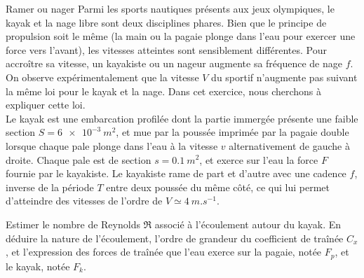 \begin{exo}[PC][3][TD]{Ramer ou nager}
  Parmi les sports nautiques présents aux jeux olympiques, le kayak et la nage libre sont deux disciplines phares. Bien que le principe de propulsion soit le même (la main ou la pagaie plonge dans l'eau pour exercer une force vers l'avant), les vitesses atteintes sont sensiblement différentes. Pour accroître sa vitesse, un kayakiste ou un nageur augmente sa fréquence de nage $f$. On observe expérimentalement que la vitesse $V$ du sportif n'augmente pas suivant la même loi pour le kayak et la nage. Dans cet exercice, nous cherchons à expliquer cette loi.\\ 

  Le kayak est une embarcation profilée dont la partie immergée présente une faible section $S=\SI{6e-3}{m^2}$, et mue par la poussée imprimée par la pagaie double lorsque chaque pale plonge dans l'eau à la vitesse $v$ alternativement de gauche à droite. Chaque pale est de section $s=\SI{0.1}{m^2}$, et exerce sur l'eau la force $F$ fournie par le kayakiste. Le kayakiste rame de part et d'autre avec une cadence $f$, inverse de la période $T$ entre deux poussée du même côté, ce qui lui permet d'atteindre des vitesses de l'ordre de $V\simeq \SI{4}{m.s^{-1}}$.
  \begin{quest}
    \item	Estimer le nombre de Reynolds $\Re$ associé à l'écoulement autour du kayak. En déduire la nature de l'écoulement, l'ordre de grandeur du coefficient de traînée $C_x$, et l'expression des forces de traînée que l'eau exerce sur la pagaie, notée $F_p$, et le kayak, notée $F_k$.
    

\end{quest}
\end{exo}
